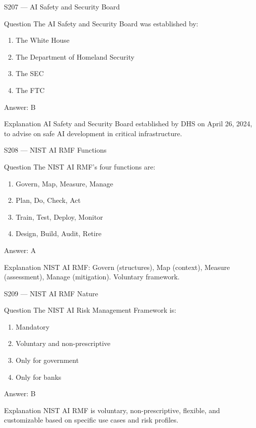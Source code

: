 \documentclass[aspectratio=169,8pt]{beamer}
\begin{document}
	\begin{frame}{S207 --- AI Safety and Security Board}
		\begin{block}{Question}
			The AI Safety and Security Board was established by:
			\begin{enumerate}
				\item The White House
				\item The Department of Homeland Security
				\item The SEC
				\item The FTC
			\end{enumerate}
		\end{block}
		\begin{exampleblock}{Answer: B}\end{exampleblock}
		\begin{block}{Explanation}
			AI Safety and Security Board established by DHS on April 26, 2024, to advise on safe AI development in critical infrastructure.
		\end{block}
	\end{frame}
	
	\begin{frame}{S208 --- NIST AI RMF Functions}
		\begin{block}{Question}
			The NIST AI RMF's four functions are:
			\begin{enumerate}
				\item Govern, Map, Measure, Manage
				\item Plan, Do, Check, Act
				\item Train, Test, Deploy, Monitor
				\item Design, Build, Audit, Retire
			\end{enumerate}
		\end{block}
		\begin{exampleblock}{Answer: A}\end{exampleblock}
		\begin{block}{Explanation}
			NIST AI RMF: Govern (structures), Map (context), Measure (assessment), Manage (mitigation). Voluntary framework.
		\end{block}
	\end{frame}
	
	\begin{frame}{S209 --- NIST AI RMF Nature}
		\begin{block}{Question}
			The NIST AI Risk Management Framework is:
			\begin{enumerate}
				\item Mandatory
				\item Voluntary and non-prescriptive
				\item Only for government
				\item Only for banks
			\end{enumerate}
		\end{block}
		\begin{exampleblock}{Answer: B}\end{exampleblock}
		\begin{block}{Explanation}
			NIST AI RMF is voluntary, non-prescriptive, flexible, and customizable based on specific use cases and risk profiles.
		\end{block}
	\end{frame}
	
\end{document}
